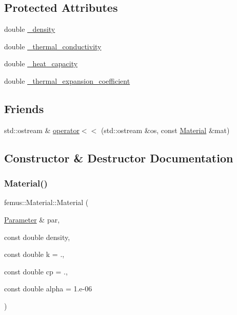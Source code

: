 \subsection*{Protected Attributes}
\begin{DoxyCompactItemize}
\item 
double \mbox{\hyperlink{classfemus_1_1_material_acfb3015e54992adb573e05aefe41eb67}{\+\_\+density}}
\item 
double \mbox{\hyperlink{classfemus_1_1_material_a196bd878073575d64e0f0c23f9c66fd3}{\+\_\+thermal\+\_\+conductivity}}
\item 
double \mbox{\hyperlink{classfemus_1_1_material_a2c33e9e062f0fc05faf38a629cdd1cba}{\+\_\+heat\+\_\+capacity}}
\item 
double \mbox{\hyperlink{classfemus_1_1_material_a42c1c271ed29d316bf8bc879fb10b4c2}{\+\_\+thermal\+\_\+expansion\+\_\+coefficient}}
\end{DoxyCompactItemize}
\subsection*{Friends}
\begin{DoxyCompactItemize}
\item 
std\+::ostream \& \mbox{\hyperlink{classfemus_1_1_material_a5bfba11792fa55afcf4fec622c4a4f4b}{operator$<$$<$}} (std\+::ostream \&os, const \mbox{\hyperlink{classfemus_1_1_material}{Material}} \&mat)
\end{DoxyCompactItemize}


\subsection{Constructor \& Destructor Documentation}
\mbox{\label{classfemus_1_1_material_a28b5c9b3bfa76ee8fc04c80ef6d59fd8}} 
\subsubsection{\texorpdfstring{Material()}{Material()}\hspace{0.1cm}{\footnotesize\ttfamily [1/3]}}
{\footnotesize\ttfamily femus\+::\+Material\+::\+Material (\begin{DoxyParamCaption}\item[{\mbox{\hyperlink{classfemus_1_1_parameter}{Parameter}} \&}]{par,  }\item[{const double}]{density,  }\item[{const double}]{k = {.},  }\item[{const double}]{cp = {.},  }\item[{const double}]{alpha = {\ttfamily 1.e-\/06} }\end{DoxyParamCaption})}

